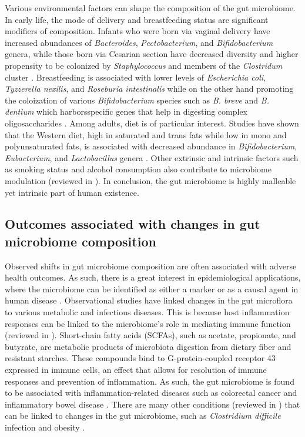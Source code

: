 Various environmental factors can shape the composition of the gut microbiome. In early life, the mode of delivery and breastfeeding status are significant modifiers of composition. Infants who were born via vaginal delivery have increased abundances of \emph{Bacteroides}, \emph{Pectobacterium}, and \emph{Bifidobacterium} genera, while those born via Cesarian section have decreased diversity and higher propensity to be colonized by \emph{Staphylococcus} and members of the \emph{Clostridum} cluster \cite{madan2016effects, kim2020delayed, stewart2018temporal}. Breastfeeding is associated with lower levels of \emph{Escherichia coli}, \emph{Tyzzerella nexilis}, and \emph{Roseburia intestinalis} while on the other hand promoting the coloization of various \emph{Bifidobacterium} species such as \emph{B. breve} and \emph{B. dentium} which harborsspecific genes that help in digesting complex oligosaccharides \cite{stewart2018temporal, vatanen2018human}. Among adults, diet is of particular interest. Studies have shown that the Western diet, high in saturated and trans fats while low in mono and polyunsaturated fats, is associated with decreased abundance in \emph{Bifidobacterium}, \emph{Eubacterium}, and \emph{Lactobacillus} genera \cite{wu2011linking}. Other extrinsic and intrinsic factors such as smoking status \cite{biedermann2013smoking} and alcohol consumption \cite{dubinkina2017links} also contribute to microbiome modulation (reviewed in \cite{schmidt2018humana}). In conclusion, the gut microbiome is highly malleable yet intrinsic part of human existence. 

\subsection{Outcomes associated with changes in gut microbiome composition}

Observed shifts in gut microbiome composition are often associated with adverse health outcomes. As such, there is a great interest in epidemiological applications, where the microbiome can be identified as either a marker or as a causal agent in human disease \cite{foxman2015use}. Observational studies have linked changes in the gut microflora to various metabolic and infectious diseases. This is because host inflammation responses can be linked to the microbiome's role in mediating immune function (reviewed in \cite{wang2020relationship}). Short-chain fatty acids (SCFAs), such as acetate, propionate, and butyrate, are metabolic products of microbiota digestion from dietary fiber and resistant starches. These compounds bind to G-protein-coupled receptor 43 expressed in immune cells, an effect that allows for resolution of immune responses and prevention of inflammation. As such, the gut microbiome is found to be associated with inflammation-related diseases such as colorectal cancer \cite{cheng2020intestinal, yu2017metagenomica} and inflammatory bowel disease \cite{gevers2014treatmentnaive, franzosa2019gut, lloyd-price2019multiomics}. There are many other conditions (reviewed in \cite{cho2012human}) that can be linked to changes in the gut microbiome, such as \emph{Clostridium difficile} infection \cite{weingarden2014microbiota} and obesity \cite{turnbaugh2009core, aoun2020influence}.   

